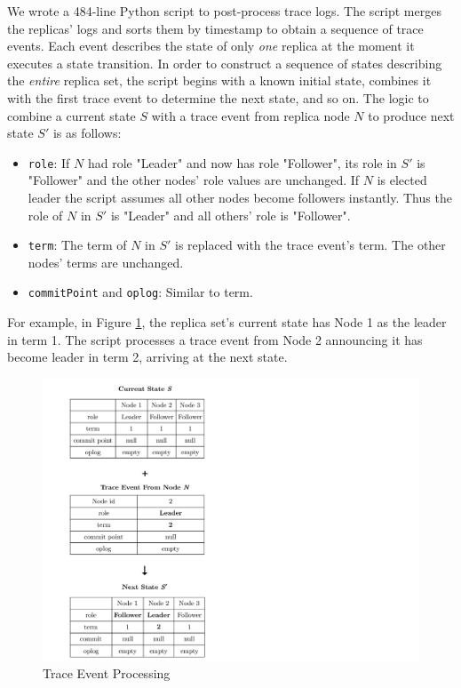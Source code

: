 \documentclass{vldb}
\begin{document}
We wrote a 484-line Python script \cite{ReplTraceChecker} to post-process trace logs. 
The script merges the replicas' logs and sorts them by timestamp to obtain a sequence of trace events. 
Each event describes the state of only \textit{one} replica at the moment it executes a state transition.
In order to construct a sequence of states describing the \textit{entire} replica set, 
the script begins with a known initial state, combines it with the first trace event to determine the next state, and so on. 
The logic to combine a current state \ensuremath{S} with a trace event from replica node \ensuremath{N} to produce next state \ensuremath{S'} is as follows:

\begin{itemize}
\item \texttt{role}: If \ensuremath{N} had role "Leader" and now has role "Follower", its role in \ensuremath{S'} is "Follower" and the other nodes' role values are unchanged. If \ensuremath{N} is elected leader the script assumes all other nodes become followers instantly. Thus the role of \ensuremath{N} in \ensuremath{S'} is "Leader" and all others' role is "Follower".
\item \texttt{term}: The term of \ensuremath{N} in \ensuremath{S'} is replaced with the trace event's term. The other nodes' terms are unchanged.
\item \texttt{commitPoint} and \texttt{oplog}: Similar to term.
\end{itemize}

For example, in Figure \ref{figure:event-processing}, the replica set's current state has Node 1 as the leader in term 1. 
The script processes a trace event from Node 2 announcing it has become leader in term 2, arriving at the next state.

\begin{figure}
\includegraphics[width=\textwidth]{event-processing.pdf}
\caption{Trace Event Processing}
\label{figure:event-processing}
\end{figure}
\end{document}
